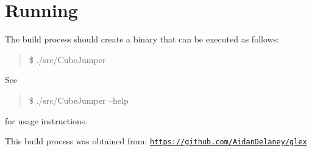 \section*{Running}

The build process should create a binary that can be executed as follows\-:

\begin{quotation}
\$ ./src/\-Cube\-Jumper

\end{quotation}


See

\begin{quotation}
\$ ./src/\-Cube\-Jumper --help

\end{quotation}


for usage instructions.

This build process was obtained from\-: \href{https://github.com/AidanDelaney/glex}{\tt https\-://github.\-com/\-Aidan\-Delaney/glex} 